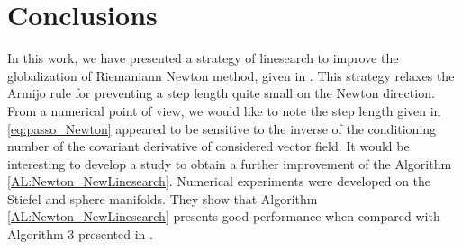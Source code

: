 \section{ Conclusions} \label{sec:conclusions}
In this work, we have presented a strategy of linesearch to improve the globalization of Riemaniann Newton method, given in \cite{bortoloti2022efficient}.
This strategy relaxes the Armijo rule for preventing a step length quite small on the Newton direction.
From a numerical point of view, we would like to note the step length given in \eqref{eq:passo_Newton} appeared to be sensitive to the inverse of the conditioning number of the covariant derivative of considered vector field. It would be interesting to develop a study to obtain a further improvement of the Algorithm \ref{AL:Newton_NewLinesearch}.
Numerical experiments were developed on the Stiefel and sphere manifolds. They show that Algorithm \ref{AL:Newton_NewLinesearch} presents good performance when compared with Algorithm 3 presented in \cite{bortoloti2022efficient}.


